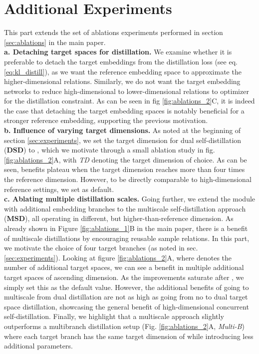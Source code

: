 \documentclass{article} \usepackage{arxiv_style,times}
\begin{document}
\section{Additional Experiments}\label{supp:add_exps}
This part extends the set of ablations experiments performed in section \ref{sec:ablations} in the main paper.\\
\textbf{a. Detaching target spaces for distillation.} We examine whether it is preferable to detach the target embeddings from the distillation loss (see eq. \ref{eq:kl_distill}), as we want the reference embedding space to approximate the higher-dimensional relations. Similarly, we do not want the target embedding networks  to reduce high-dimensional to lower-dimensional relations to optimizer for the distillation constraint. As can be seen in fig \ref{fig:ablations_2}C, it is indeed the case that detaching the target embedding spaces is notably beneficial for a stronger reference embedding, supporting the previous motivation.\\
\textbf{b. Influence of varying target dimensions.} As noted at the beginning of section \ref{sec:experiments}, we set the target dimension for dual self-distillation (\textbf{DSD}) to , which we motivate through a small ablation study in fig. \ref{fig:ablations_2}A, with \textit{TD} denoting the target dimension of choice. As can be seen, benefits plateau when the target dimension reaches more than four times the reference dimension. However, to be directly comparable to high-dimensional reference settings, we set  as default.\\
\textbf{c. Ablating multiple distillation scales.} Going further, we extend the module with additional embedding branches to the multiscale self-distillation approach (\textbf{MSD}), all operating in different, but higher-than-reference dimension. As already shown in Figure \ref{fig:ablations_1}B in the main paper, there is a benefit of multiscale distillations by encouraging reusable sample relations. In this part, we motivate the choice of four target branches (as noted in sec. \ref{sec:experiments}). Looking at figure \ref{fig:ablations_2}A, where  denotes the number of additional target spaces, we can see a benefit in multiple additional target spaces of ascending dimension. As the improvements saturate after , we simply set this as the default value. However, the additional benefits of going to multiscale from dual distillation are not as high as going from no to dual target space distillation, showcasing the general benefit of high-dimensional concurrent self-distillation. Finally, we highlight that a multiscale approach slightly outperforms a multibranch distillation setup (Fig. \ref{fig:ablations_2}A, \textit{Multi-B}) where each target branch has the same target dimension of  while introducing less additional parameters.\\
\end{document}
